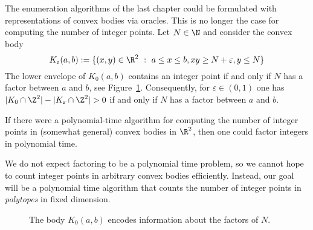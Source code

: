 The enumeration algorithms of the last chapter could be formulated with representations of convex bodies via oracles.
This is no longer the case for computing the number of integer points.
Let $N \in \N$ and consider the convex body
\[
  K_\varepsilon(a,b) := \{ (x,y) \in \R^2 ~:~ a \leq x \leq b, xy \geq N + \varepsilon, y \leq N \}
\]
The lower envelope of $K_0(a, b)$ contains an integer point if and only if $N$ has a factor between $a$ and $b$,
see Figure~\ref{fig:factoring-body}.
Consequently, for $\varepsilon \in (0,1)$ one has $|K_0 \cap \Z^2| - |K_\varepsilon \cap \Z^2| > 0$ if and only if $N$ has a factor between $a$ and $b$.
\begin{fact}
  If there were a polynomial-time algorithm for computing the number of integer points in (somewhat general) convex bodies in $\R^2$,
  then one could factor integers in polynomial time.
\end{fact}
We do not expect factoring to be a polynomial time problem,
so we cannot hope to count integer points in arbitrary convex bodies efficiently.
Instead, our goal will be a polynomial time algorithm that counts the number of integer points in \emph{polytopes}
in fixed dimension.

\begin{figure}
  \begin{center}
  \end{center}
  \caption{The body $K_0(a,b)$ encodes information about the factors of $N$.}
  \label{fig:factoring-body}
\end{figure}



